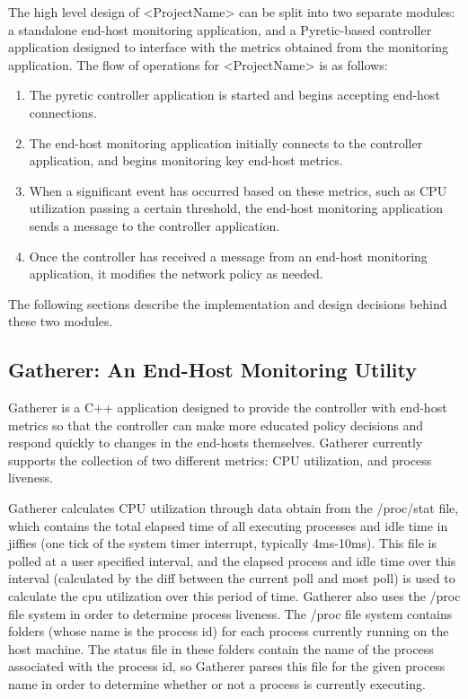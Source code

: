 \documentclass[10pt]{article}
\begin{document}
The high level design of <ProjectName> can be split into two separate modules: a standalone end-host monitoring application, and a Pyretic-based controller application designed to interface with the metrics obtained from the monitoring application.  The flow of operations for <ProjectName> is as follows:
\begin{enumerate}
\item The pyretic controller application is started and begins accepting end-host connections.
\item The end-host monitoring application initially connects to the controller application, and begins monitoring key end-host metrics.
\item When a significant event has occurred based on these metrics, such as CPU utilization passing a certain threshold, the end-host monitoring application sends a message to the controller application. 
\item Once the controller has received a message from an end-host monitoring application, it modifies the network policy as needed.
\end{enumerate}

The following sections describe the implementation and design decisions behind these two modules.

\subsection{Gatherer: An End-Host Monitoring Utility}

Gatherer is a C++ application designed to provide the controller with end-host metrics so that the controller can make more educated policy decisions and respond quickly to changes in the end-hosts themselves. Gatherer currently supports the collection of two different metrics: CPU utilization, and process liveness. 

Gatherer calculates CPU utilization through data obtain from the /proc/stat file, which contains the total elapsed time of all executing processes and idle time in jiffies (one tick of the system timer interrupt, typically 4ms-10ms). This file is polled at a user specified interval, and the elapsed process and idle time over this interval (calculated by the diff between the current poll and most poll) is used to calculate the cpu utilization over this period of time. Gatherer also uses the /proc file system in order to determine process liveness. The /proc file system contains folders (whose name is the process id) for each process currently running on the host machine. The status file in these folders contain the name of the process associated with the process id, so Gatherer parses this file for the given process name in order to determine whether or not a process is currently executing.
\end{document}
